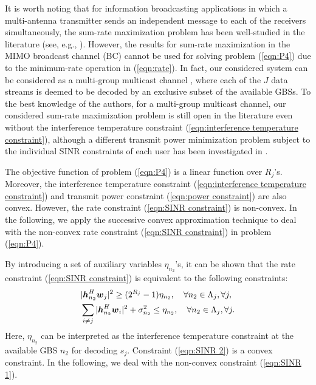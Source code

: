 \documentclass[onecolumn, draftclsnofoot, 12pt]{IEEEtran}
\newcommand{\mv}[1]{\mbox{\boldmath{$ #1 $}}}
\begin{document}
It is worth noting that for information broadcasting applications in which a multi-antenna transmitter sends an independent message to each of the receivers simultaneously, the sum-rate maximization problem has been well-studied in the literature (see, e.g., \cite{WMMSE,optimality}). However, the results for sum-rate maximization in the MIMO broadcast channel (BC) cannot be used for solving problem (\ref{eqn:P4}) due to the minimum-rate operation in (\ref{eqn:rate}). In fact, our considered system can be considered as a multi-group multicast channel \cite{multicasting}, where each of the $J$ data streams is deemed to be decoded by an exclusive subset of the available GBSs. To the best knowledge of the authors, for a multi-group multicast channel, our considered sum-rate maximization problem is still open in the literature even without the interference temperature constraint (\ref{eqn:interference temperature constraint}), although a different transmit power minimization problem subject to the individual SINR constraints of each user has been investigated in \cite{multicasting}.

The objective function of problem (\ref{eqn:P4}) is a linear function over $R_j$'s. Moreover, the interference temperature constraint (\ref{eqn:interference temperature constraint}) and transmit power constraint (\ref{eqn:power constraint}) are also convex. However, the rate constraint (\ref{eqn:SINR constraint}) is non-convex. In the following, we apply the successive convex approximation technique to deal with the non-convex rate constraint (\ref{eqn:SINR constraint}) in problem (\ref{eqn:P4}).

By introducing a set of auxiliary variables $\eta_{n_2}$'s, it can be shown that the rate constraint (\ref{eqn:SINR constraint}) is equivalent to the following constraints:
\begin{align}
& |\mv{h}_{n_2}^H\mv{w}_j|^2\geq (2^{R_j}-1)\eta_{n_2}, ~~~ \forall n_2\in \Lambda_j, \forall j, \label{eqn:SINR 1} \\
& \sum\limits_{i\neq j} |\mv{h}_{n_2}^H\mv{w}_i|^2+\sigma_{n_2}^2\leq \eta_{n_2}, ~~~ \forall n_2\in \Lambda_j, \forall j. \label{eqn:SINR 2}
\end{align}Here, $\eta_{n_2}$ can be interpreted as the interference temperature constraint at the available GBS $n_2$ for decoding $s_j$. Constraint (\ref{eqn:SINR 2}) is a convex constraint. In the following, we deal with the non-convex constraint (\ref{eqn:SINR 1}).
\end{document}

